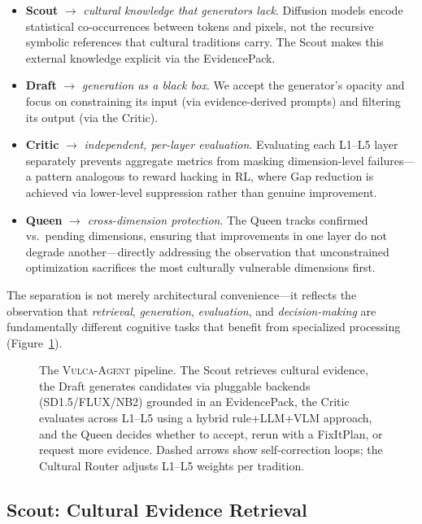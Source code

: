 \documentclass[sigconf, screen, review, anonymous]{acmart}
\newcommand{\system}{\textsc{Vulca-Agent}}
\newcommand{\Lx}[1]{L#1}
\begin{document}
\begin{itemize}
    \item \textbf{Scout} $\to$ \emph{cultural knowledge that generators lack}. Diffusion models encode statistical co-occurrences between tokens and pixels, not the recursive symbolic references that cultural traditions carry. The Scout makes this external knowledge explicit via the EvidencePack.
    \item \textbf{Draft} $\to$ \emph{generation as a black box}. We accept the generator's opacity and focus on constraining its input (via evidence-derived prompts) and filtering its output (via the Critic).
    \item \textbf{Critic} $\to$ \emph{independent, per-layer evaluation}. Evaluating each \Lx{1}--\Lx{5} layer separately prevents aggregate metrics from masking dimension-level failures---a pattern analogous to reward hacking in RL, where Gap reduction is achieved via lower-level suppression rather than genuine improvement.
    \item \textbf{Queen} $\to$ \emph{cross-dimension protection}. The Queen tracks confirmed vs.\ pending dimensions, ensuring that improvements in one layer do not degrade another---directly addressing the observation that unconstrained optimization sacrifices the most culturally vulnerable dimensions first.
\end{itemize}

\noindent
The separation is not merely architectural convenience---it reflects the observation that \emph{retrieval}, \emph{generation}, \emph{evaluation}, and \emph{decision-making} are fundamentally different cognitive tasks that benefit from specialized processing (Figure~\ref{fig:architecture}).

\begin{figure}[t]
    \centering
    
    \caption{The \system{} pipeline. The Scout retrieves cultural evidence, the Draft generates candidates via pluggable backends (SD1.5/FLUX/NB2) grounded in an EvidencePack, the Critic evaluates across \Lx{1}--\Lx{5} using a hybrid rule+LLM+VLM approach, and the Queen decides whether to accept, rerun with a FixItPlan, or request more evidence. Dashed arrows show self-correction loops; the Cultural Router adjusts \Lx{1}--\Lx{5} weights per tradition.}
    \label{fig:architecture}
\end{figure}

\subsection{Scout: Cultural Evidence Retrieval}
\label{sec:scout}
\end{document}

